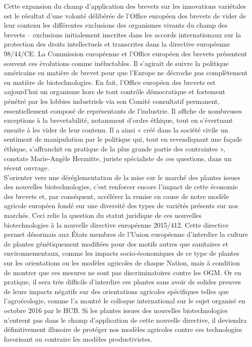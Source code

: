 \documentclass[8pt]{article}
\begin{document}
Cette expansion du champ d’application
des brevets sur les innovations variétales
est le résultat d’une volonté délibérée de
l’Office européen des brevets de vider de
leur contenu les différentes exclusions des
organismes vivants du champ des brevets
– exclusions initialement inscrites dans les
accords internationaux sur la protection des
droits intellectuels et transcrites dans la
directive européenne 98/44/CE.
La Commission européenne et l’Office européen des brevets présentent souvent ces
évolutions comme inéluctables. Il s’agirait
de suivre la politique américaine en matière
de brevet pour que l’Europe ne décroche pas
complètement en matière de biotechnologies. En fait, l’Office européen des brevets
est aujourd’hui un organisme hors de tout
contrôle démocratique et fortement pénétré
par les lobbies industriels via son Comité
consultatif permanent, essentiellement
composé de représentants de l’industrie.
Il affiche de nombreuses exceptions à la
brevetabilité, notamment d’ordre éthique,
tout en s’évertuant ensuite à les vider de
leur contenu. Il a ainsi « créé dans la société
civile un sentiment de manipulation par le
politique qui, tout en revendiquant une façade
éthique, s’affranchit en pratique de la plus
grande partie des contraintes », constate
Marie-Angèle Hermitte, juriste spécialiste
de ces questions, dans un récent ouvrage.\\

S’orienter vers une déréglementation de
la mise sur le marché des plantes issues
des nouvelles biotechnologies, c’est renforcer encore l’impact de cette économie
des brevets et, par conséquent, accélérer
la remise en cause de notre modèle agricole
européen fondé sur une diversité des types
de variétés présents sur nos marchés. Ceci
relie la question du statut juridique de ces nouvelles biotechnologies à la nouvelle directive
européenne 2015/412. Cette directive permet
désormais aux États membres de l’Union européenne d’interdire la culture de plantes
génétiquement modifiées pour des motifs
autres que sanitaires et environnementaux,
comme les impacts socio-économiques de
ce type de plantes sur les orientations ou les
modèles agricoles de chaque Nation, mais
à condition de montrer que ces mesures ne
sont pas discriminatoires contre les OGM. Or
en pratique, il sera très difficile d’interdire
ces plantes sans avoir de solides preuves de
leurs impacts négatifs sur des orientations
agricoles spécifiques telles que l’agroécologie,
comme l’a montré le colloque international
sur le sujet organisé en octobre 2016 par
le HCB. Si les plantes issues des nouvelles
biotechnologies n’entrent pas dans le champ
d’application de cette nouvelle directive, il
deviendra définitivement illusoire de protéger
nos modèles agricoles contre ces technologies favorisant au contraire les modèles
productivistes.\\
\end{document}
